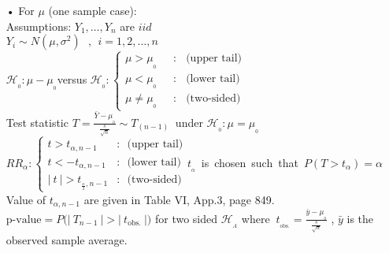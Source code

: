 \documentclass[14pt,twoside,a4paper,fleqn]{article}
\theoremstyle{plain}
\begin{document}
\begin{enumerate}
\item[•] For $\mu$ (one sample case):\hfill\\
         Assumptions: $Y_1,\ldots,Y_n$ are $iid$\\
         \tab[2.3cm]$Y_i \sim N(\mu,\sigma^2)\ \ \ , \ \ i=1,2,\ldots,n$\\
         $\mathcal{H}_{_0}: \mu - \mu_{_0}$\tab versus \tab $\mathcal{H}_{_0}: \left\{\begin{array}{lr}
         \mu > \mu_{_0}\ \ \ &:\ \ \ \ \text{(upper tail)}\\
         \mu < \mu_{_0}\ \ \ &:\ \ \ \ \text{(lower tail)}\\
         \mu\neq\mu_{_0}\ \ \ &:\ \ \ \ \text{(two-sided)}
         \end{array}
         \right.$\\
         Test statistic $T = \frac{\bar{Y}-\mu_{_0}}{\frac{s}{\sqrt{n}}} \sim T_{(n-1)}\ $ under $\mathcal{H}_{_0}\colon \mu=\mu_{_0}$\\
         ${RR}_\alpha : \left\{ \begin{array}{lr}
         t > t_{\alpha , n-1} &: \ \ \ \text{(upper tail)}\\
         t < -t_{\alpha , n-1} &: \ \ \ \text{(lower tail)}\\
         |\ t\ | > t_{_\frac{\alpha}{2},n-1} &: \ \ \ \text{(two-sided)}
         \end{array}\right.$\tab \mbox{$t_{_\alpha}$ is chosen such that $P(T>t_\alpha) = \alpha$}\\
         Value of $t_{\alpha, n-1}$ are given in Table VI, App.3, page 849.\\
         $\text{p-value} = P\big(|\ T_{n-1}\ | > |\ t_{\text{obs.}}\ |\big)$ for two sided $\mathcal{H}_{_A}$ where \mbox{$\ t_{_{\text{obs.}}} = \frac{\bar{y} - \mu_{_0}}{\frac{s}{\sqrt{n}}}$} , $\bar{y}$ is the observed sample average.
         

\end{enumerate}
\end{document}
